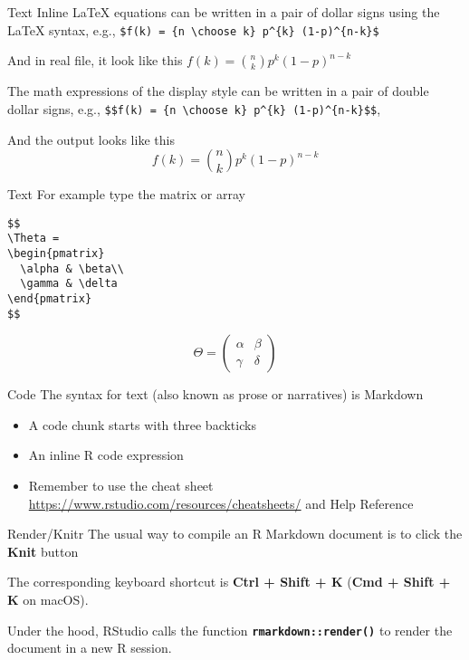 \documentclass[
  ignorenonframetext,
]{beamer}
\begin{document}
\begin{frame}[fragile]{Text}
\label{text}
Inline LaTeX equations can be written in a pair of dollar signs using
the LaTeX syntax, e.g.,
\texttt{\$f(k)\ =\ \{n\ \textbackslash{}choose\ k\}\ p\^{}\{k\}\ (1-p)\^{}\{n-k\}\$}

And in real file, it look like this
\(f(k) = {n \choose k} p^{k} (1-p)^{n-k}\)

The math expressions of the display style can be written in a pair of
double dollar signs, e.g.,
\texttt{\$\$f(k)\ =\ \{n\ \textbackslash{}choose\ k\}\ p\^{}\{k\}\ (1-p)\^{}\{n-k\}\$\$},

And the output looks like this
\[f(k) = {n \choose k} p^{k} (1-p)^{n-k}\]
\end{frame}

\begin{frame}[fragile]{Text}
\label{text-1}
For example type the matrix or array

\begin{verbatim}
$$
\Theta = 
\begin{pmatrix}
  \alpha & \beta\\
  \gamma & \delta
\end{pmatrix}
$$
\end{verbatim}

\[\Theta = \begin{pmatrix}\alpha & \beta\\
\gamma & \delta
\end{pmatrix}\]
\end{frame}

\begin{frame}{Code}
\label{code}
The syntax for text (also known as prose or narratives) is Markdown

\begin{itemize}
\item
  A code chunk starts with three backticks
\item
  An inline R code expression
\item
  Remember to use the cheat sheet
  \url{https://www.rstudio.com/resources/cheatsheets/} and Help
  Reference
\end{itemize}
\end{frame}

\begin{frame}[fragile]{Render/Knitr}
\label{renderknitr}
The usual way to compile an R Markdown document is to click the
\textbf{Knit} button

The corresponding keyboard shortcut is \textbf{Ctrl + Shift + K}
(\textbf{Cmd + Shift + K} on macOS).

Under the hood, RStudio calls the function
\textbf{\texttt{rmarkdown::render()}} to render the document in a new R
session.
\end{frame}
\end{document}
